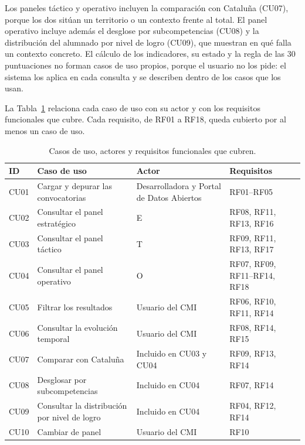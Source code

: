\documentclass[12pt, a4paper, oneside]{report}
\begin{document}
Los paneles táctico y operativo incluyen la comparación con Cataluña (CU07), porque los dos sitúan un territorio o un contexto frente al total. El panel operativo incluye además el desglose por subcompetencias (CU08) y la distribución del alumnado por nivel de logro (CU09), que muestran en qué falla un contexto concreto. El cálculo de los indicadores, su estado y la regla de las 30 puntuaciones no forman casos de uso propios, porque el usuario no los pide: el sistema los aplica en cada consulta y se describen dentro de los casos que los usan.

La Tabla~\ref{tab:casos_uso} relaciona cada caso de uso con su actor y con los requisitos funcionales que cubre. Cada requisito, de RF01 a RF18, queda cubierto por al menos un caso de uso.

\begin{table}[H]
\centering
\small
\renewcommand{\arraystretch}{1.1}
\begin{tabularx}{\textwidth}{@{} p{1.1cm} X >{\raggedright\arraybackslash}p{3.7cm} >{\raggedright\arraybackslash}p{2.9cm} @{}}
\toprule
\textbf{ID} & \textbf{Caso de uso} & \textbf{Actor} & \textbf{Requisitos} \\ \midrule
CU01 & Cargar y depurar las convocatorias & Desarrolladora y Portal de Datos Abiertos & RF01--RF05 \\ \addlinespace
CU02 & Consultar el panel estratégico & E & RF08, RF11, RF13, RF16 \\ \addlinespace
CU03 & Consultar el panel táctico & T & RF09, RF11, RF13, RF17 \\ \addlinespace
CU04 & Consultar el panel operativo & O & RF07, RF09, RF11--RF14, RF18 \\ \addlinespace
CU05 & Filtrar los resultados & Usuario del CMI & RF06, RF10, RF11, RF14 \\ \addlinespace
CU06 & Consultar la evolución temporal & Usuario del CMI & RF08, RF14, RF15 \\ \addlinespace
CU07 & Comparar con Cataluña & Incluido en CU03 y CU04 & RF09, RF13, RF14 \\ \addlinespace
CU08 & Desglosar por subcompetencias & Incluido en CU04 & RF07, RF14 \\ \addlinespace
CU09 & Consultar la distribución por nivel de logro & Incluido en CU04 & RF04, RF12, RF14 \\ \addlinespace
CU10 & Cambiar de panel & Usuario del CMI & RF10 \\ \bottomrule
\end{tabularx}
\caption{Casos de uso, actores y requisitos funcionales que cubren.}
\label{tab:casos_uso}
\end{table}
\end{document}
